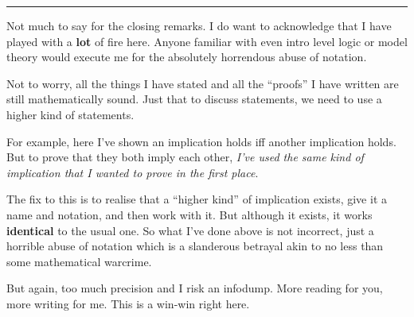 \hrule

Not much to say for the closing remarks. I do want to acknowledge that I have played with a \textbf{lot} of fire here. Anyone familiar with even intro level logic or model theory would execute me for the absolutely horrendous abuse of notation.

Not to worry, all the things I have stated and all the ``proofs'' I have written are still mathematically sound. Just that to discuss statements, we need to use a higher kind of statements.

For example, here I've shown an implication holds iff another implication holds. But to prove that they both imply each other, \textit{I've used the same kind of implication that I wanted to prove in the first place}.

The fix to this is to realise that a ``higher kind'' of implication exists, give it a name and notation, and then work with it. But although it exists, it works \textbf{identical} to the usual one. So what I've done above is not incorrect, just a horrible abuse of notation which is a slanderous betrayal akin to no less than some mathematical warcrime.

But again, too much precision and I risk an infodump. More reading for you, more writing for me. This is a win-win right here.
